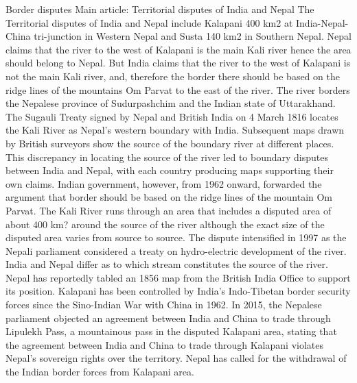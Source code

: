 \documentclass[
  openany]{book}
\begin{document}
Border disputes
Main article: Territorial disputes of India and Nepal
The Territorial disputes of India and Nepal include Kalapani 400 km2 at India-Nepal-China tri-junction in Western Nepal and Susta 140 km2 in Southern Nepal. Nepal claims that the river to the west of Kalapani is the main Kali river hence the area should belong to Nepal. But India claims that the river to the west of Kalapani is not the main Kali river, and, therefore the border there should be based on the ridge lines of the mountains Om Parvat to the east of the river. The river borders the Nepalese province of Sudurpashchim and the Indian state of Uttarakhand. The Sugauli Treaty signed by Nepal and British India on 4 March 1816 locates the Kali River as Nepal's western boundary with India. Subsequent maps drawn by British surveyors show the source of the boundary river at different places. This discrepancy in locating the source of the river led to boundary disputes between India and Nepal, with each country producing maps supporting their own claims. Indian government, however, from 1962 onward, forwarded the argument that border should be based on the ridge lines of the mountain Om Parvat. The Kali River runs through an area that includes a disputed area of about 400 km? around the source of the river although the exact size of the disputed area varies from source to source. The dispute intensified in 1997 as the Nepali parliament considered a treaty on hydro-electric development of the river. India and Nepal differ as to which stream constitutes the source of the river. Nepal has reportedly tabled an 1856 map from the British India Office to support its position. Kalapani has been controlled by India's Indo-Tibetan border security forces since the Sino-Indian War with China in 1962. In 2015, the Nepalese parliament objected an agreement between India and China to trade through Lipulekh Pass, a mountainous pass in the disputed Kalapani area, stating that the agreement between India and China to trade through Kalapani violates Nepal's sovereign rights over the territory. Nepal has called for the withdrawal of the Indian border forces from Kalapani area.
\end{document}

